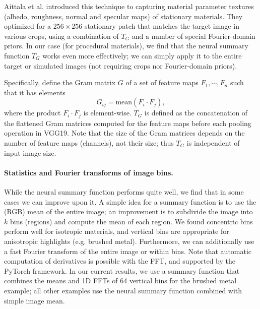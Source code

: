 Aittala et al. \cite{aittala2016reflectance} introduced this technique to capturing material parameter textures (albedo, roughness, normal and specular maps) of stationary materials. They optimized for a $256 \times 256$ stationary patch that matches the target image in various crops, using a combination of $T_G$ and a number of special Fourier-domain priors. In our case (for procedural materials), we find that the neural summary function $T_G$ works even more effectively; we can simply apply it to the entire target or simulated images (not requiring crops nor Fourier-domain priors).

Specifically, define the Gram matrix $G$ of a set of feature maps $F_1, \cdots, F_n$ such that it has elements
\begin{equation}
	G_{ij} = \mbox{mean}(F_i \cdot F_j),
\end{equation}
where the product $F_i \cdot F_j$ is element-wise. $T_G$ is defined as the concatenation of the flattened Gram matrices computed for the feature maps before each pooling operation in VGG19. Note that the size of the Gram matrices depends on the number of feature maps (channels), not their size; thus $T_G$ is independent of input image size.

\paragraph{Statistics and Fourier transforms of image bins.}
While the neural summary function performs quite well, we find that in some cases we can improve upon it.
A simple idea for a summary function is to use the (RGB) mean of the entire image; an improvement is to subdivide the image into $k$ bins (regions) and compute the mean of each region. We found concentric bins perform well for isotropic materials, and vertical bins are appropriate for anisotropic highlights (e.g. brushed metal). Furthermore, we can additionally use a fast Fourier transform of the entire image or within bins. Note that automatic computation of derivatives is possible with the FFT, and supported by the PyTorch framework. In our current results, we use a summary function that combines the means and 1D FFTs of 64 vertical bins for the brushed metal example; all other examples use the neural summary function combined with simple image mean.
